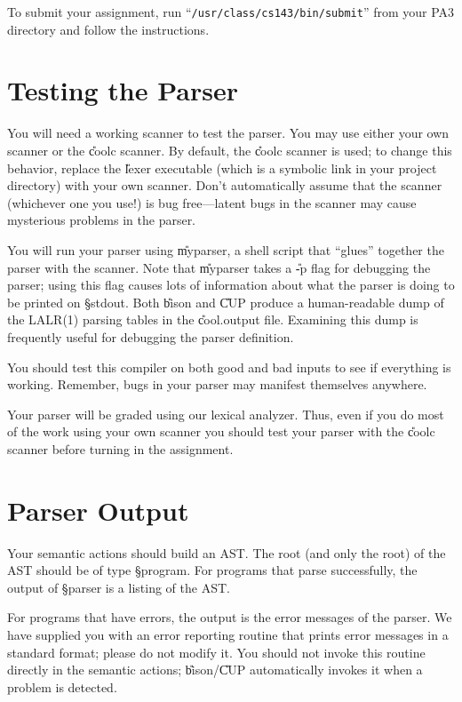 \documentclass[11pt]{article}
\begin{document}
To submit your assignment, run ``{\tt /usr/class/cs143/bin/submit}'' from your PA3
directory and follow the instructions.


\section{Testing the Parser}

You will need a working scanner to test the parser.  You may use either
your own scanner or the \U{coolc} scanner.  By default, the \U{coolc}
scanner is used; to change this behavior, replace the \U{lexer}
executable (which
is a symbolic link in your project directory) with your own scanner.
Don't automatically assume that the scanner (whichever one you use!)  is
bug free---latent bugs in the scanner may cause mysterious problems in
the parser.

You will run your parser using \U{myparser}, a shell script that
``glues'' together the parser with the scanner.  Note that \U{myparser}
takes a \U{-p} flag for debugging the parser; using this flag causes
lots of information about what the parser is doing to be printed on
\S{stdout}.  Both \U{bison} and \U{CUP} produce a human-readable dump of
the LALR(1) parsing tables in the \U{cool.output} file.  Examining this
dump is frequently useful for debugging the parser definition.

You should test this compiler on both good and bad inputs to
see if everything is working.  Remember, bugs in your parser may
manifest themselves anywhere.

Your parser will be graded using our lexical analyzer.  Thus, even if
you do most of the work using your own scanner you should test your
parser with the \U{coolc} scanner before turning in the assignment.

\section{Parser Output}

Your semantic actions should build an AST.  The root (and only the root)
of the AST should be of type \S{program}.  For programs that parse
successfully, the output of \S{parser} is a listing of the AST.

For programs that have errors, the output is the error messages of the
parser. We have supplied you with an error reporting routine that prints
error messages in a standard format; please do not modify it. You should
not invoke this routine directly in the semantic actions;
\U{bison}/\U{CUP} automatically invokes it when a problem is detected.
\end{document}
